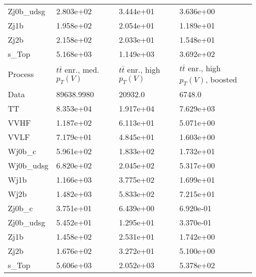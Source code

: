 \begin{table}
{\begin{tabularx}{0.8\textwidth}{|X|X|X|X|}
Zj0b\_udsg & 2.803e+02 & 3.444e+01 & 3.636e+00 \\
Zj1b & 1.958e+02 & 2.054e+01 & 1.189e+01 \\
Zj2b & 2.158e+02 & 2.033e+01 & 1.548e+01 \\
s\_Top & 5.168e+03 & 1.149e+03 & 3.692e+02 \\
\hline
\hline
Process & $t\bar{t}$ enr., med. $p_{T}(V)$ & $t\bar{t}$ enr., high $p_{T}(V)$ & $t\bar{t}$ enr., high $p_{T}(V)$, boosted \\
\hline
Data & 89638.9980 & 20932.0 & 6748.0 \\
\hline
TT & 8.353e+04 & 1.917e+04 & 7.629e+03 \\
VVHF & 1.187e+02 & 6.113e+01 & 5.071e+00 \\
VVLF & 7.179e+01 & 4.845e+01 & 1.603e+00 \\
Wj0b\_c & 5.961e+02 & 1.833e+02 & 1.732e+01 \\
Wj0b\_udsg & 6.820e+02 & 2.045e+02 & 5.317e+00 \\
Wj1b & 1.166e+03 & 3.775e+02 & 1.699e+01 \\
Wj2b & 1.482e+03 & 5.833e+02 & 7.215e+01 \\
Zj0b\_c & 3.751e+01 & 6.439e+00 & 6.920e-01 \\
Zj0b\_udsg & 5.452e+01 & 1.295e+01 & 3.370e-01 \\
Zj1b & 1.458e+02 & 2.531e+01 & 1.742e+00 \\
Zj2b & 1.676e+02 & 3.272e+01 & 5.100e+00 \\
s\_Top & 5.606e+03 & 2.052e+03 & 5.378e+02 \\
\hline
\end{tabularx}
}
\label{tab:cr-Wmn-2018}
\end{table}

